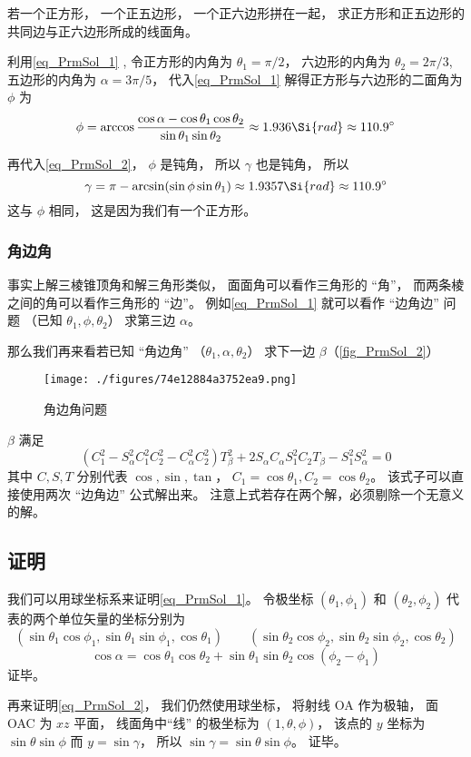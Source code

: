 \begin{example}{}
若一个正方形， 一个正五边形， 一个正六边形拼在一起， 求正方形和正五边形的共同边与正六边形所成的线面角。

利用\autoref{eq_PrmSol_1} , 令正方形的内角为 $\theta_1 = \pi/2$， 六边形的内角为 $\theta_2 = 2\pi/3$, 五边形的内角为 $\alpha = 3\pi/5$， 代入\autoref{eq_PrmSol_1} 解得正方形与六边形的二面角为 $\phi$ 为
\begin{equation}
\phi = \arccos\frac{\cos\alpha - \cos\theta_1 \cos\theta_2}{\sin\theta_1\sin\theta_2} \approx 1.936\Si{rad} \approx 110.9^\circ
\end{equation}

再代入\autoref{eq_PrmSol_2}， $\phi$ 是钝角， 所以 $\gamma$ 也是钝角， 所以
\begin{equation}
\gamma = \pi - \arcsin(\sin\phi \sin\theta_1) \approx 1.9357 \Si{rad} \approx 110.9^\circ
\end{equation}
这与 $\phi$ 相同， 这是因为我们有一个正方形。
\end{example}

\subsubsection{角边角}
事实上解三棱锥顶角和解三角形类似， 面面角可以看作三角形的 “角”， 而两条棱之间的角可以看作三角形的 “边”。 例如\autoref{eq_PrmSol_1} 就可以看作 “边角边” 问题 （已知 $\theta_1, \phi, \theta_2$） 求第三边 $\alpha$。


那么我们再来看若已知 “角边角” （$\theta_1, \alpha, \theta_2$） 求下一边 $\beta$（\autoref{fig_PrmSol_2}）
\begin{figure}[ht]
\centering
\texttt{[image: ./figures/74e12884a3752ea9.png]}
\caption{角边角问题} \label{fig_PrmSol_2}
\end{figure}
$\beta$ 满足
\begin{equation}\label{eq_PrmSol_3}
(C_1^2 - S_\alpha^2 C_1^2 C_2^2 - C_\alpha^2 C_2^2)T_\beta^2 + 2S_\alpha C_\alpha S_1^2 C_2 T_\beta - S_1^2 S_\alpha^2 = 0
\end{equation}
其中 $C,S,T$ 分别代表 $\cos, \sin, \tan$， $C_1 = \cos\theta_1, C_2 = \cos\theta_2$。 该式子可以直接使用两次 “边角边” 公式解出来。 注意上式若存在两个解，必须剔除一个无意义的解。

\subsection{证明}
我们可以用球坐标系来证明\autoref{eq_PrmSol_1}。 令极坐标 $(\theta_1, \phi_1)$ 和 $(\theta_2, \phi_2)$ 代表的两个单位矢量的坐标分别为
\begin{equation}
(\sin\theta_1\cos\phi_1, \sin\theta_1\sin\phi_1, \cos\theta_1)
\qquad
(\sin\theta_2\cos\phi_2, \sin\theta_2\sin\phi_2, \cos\theta_2)
\end{equation}
\begin{equation}
\cos\alpha = \cos\theta_1 \cos\theta_2 + \sin\theta_1 \sin\theta_2 \cos(\phi_2 - \phi_1)
\end{equation}
证毕。

再来证明\autoref{eq_PrmSol_2}， 我们仍然使用球坐标， 将射线 OA 作为极轴， 面 OAC 为 $xz$ 平面， 线面角中“线” 的极坐标为 $(1, \theta, \phi)$， 该点的 $y$ 坐标为 $\sin\theta \sin\phi$ 而 $y = \sin\gamma$， 所以 $\sin\gamma = \sin\theta \sin\phi$。 证毕。